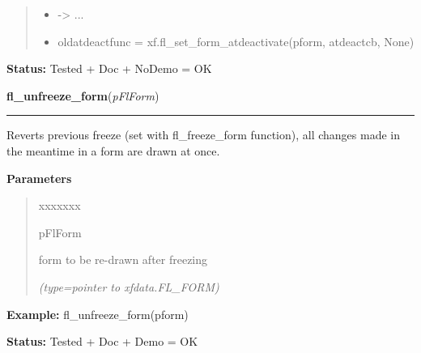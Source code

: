 \begin{boxedminipage}{\funcwidth}
\begin{quote}
\begin{itemize}
  \item {\textbar}-{\textgreater}{\textbar} ...



  \item oldatdeactfunc = xf.fl\_set\_form\_atdeactivate(pform, atdeactcb, None)



\end{itemize}

\end{quote}

\textbf{Status:} Tested + Doc + NoDemo = OK



    \end{boxedminipage}

    \label{xformslib:flbasic:fl_unfreeze_form}

    \vspace{0.5ex}

\hspace{.8\funcindent}\begin{boxedminipage}{\funcwidth}

    \raggedright \textbf{fl\_unfreeze\_form}(\textit{pFlForm})

    \vspace{-1.5ex}

    \rule{\textwidth}{0.5\fboxrule}
\setlength{\parskip}{2ex}
    Reverts previous freeze (set with fl\_freeze\_form function), all 
    changes made in the meantime in a form are drawn at once.

\setlength{\parskip}{1ex}
      \textbf{Parameters}
      \vspace{-1ex}

      \begin{quote}
        \begin{Ventry}{xxxxxxx}

          \item[pFlForm]

          form to be re-drawn after freezing

            {\it (type=pointer to xfdata.FL\_FORM)}

        \end{Ventry}

      \end{quote}

\textbf{Example:} fl\_unfreeze\_form(pform)



\textbf{Status:} Tested + Doc + Demo = OK



    \end{boxedminipage}

